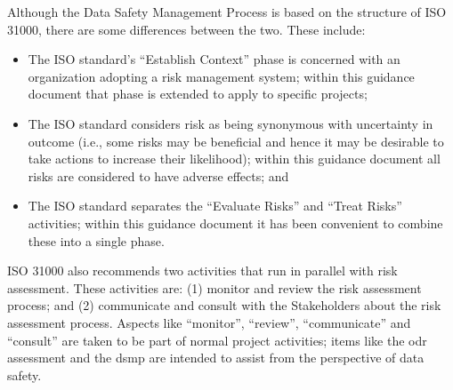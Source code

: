 Although the Data Safety Management Process is based on the structure of ISO 31000, there are some differences between the two. These include:
\begin{itemize}
	\item The ISO standard's ``Establish Context'' phase is concerned with an organization adopting a risk management system; within this guidance document that phase is extended to apply to specific projects;
	\item The ISO standard considers risk as being synonymous with uncertainty in outcome (i.e., some risks may be beneficial and hence it may be desirable to take actions to increase their likelihood); within this guidance document all risks are considered to have adverse effects; and
	\item The ISO standard separates the ``Evaluate Risks'' and ``Treat Risks'' activities; within this guidance document it has been convenient to combine these into a single phase.
\end{itemize}

ISO 31000 also recommends two activities that run in parallel with risk assessment. These activities are: (1) monitor and review the risk assessment process; and (2) communicate and consult with the Stakeholders about the risk assessment process. Aspects like ``monitor'', ``review'', ``communicate'' and ``consult'' are taken to be part of normal project activities; items like the \gls{odr} assessment and the \gls{dsmp} are intended to assist from the perspective of data safety.

